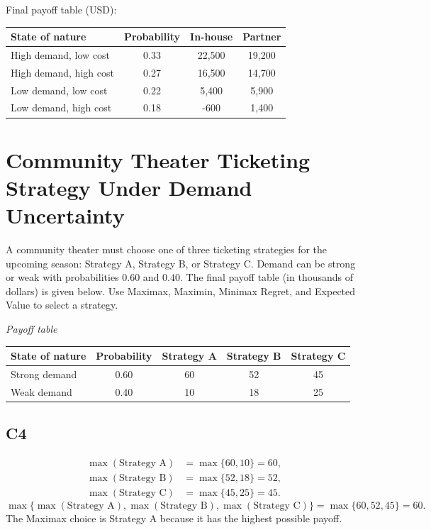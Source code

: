\begin{ExamProblems}
		Final payoff table (USD):
		\begin{center}
			\begin{tabular}{l c c c}
				\toprule
				State of nature & Probability & In-house & Partner \\
				\midrule
				High demand, low cost & 0.33 & 22{,}500 & 19{,}200 \\
				High demand, high cost & 0.27 & 16{,}500 & 14{,}700 \\
				Low demand, low cost & 0.22 & 5{,}400 & 5{,}900 \\
				Low demand, high cost & 0.18 & -600 & 1{,}400 \\
				\bottomrule
			\end{tabular}
		\end{center}
		
		\item
		\section{Community Theater Ticketing Strategy Under Demand Uncertainty}
		A community theater must choose one of three ticketing strategies for the upcoming season: Strategy A, Strategy B,
		or Strategy C. Demand can be strong or weak with probabilities $0.60$ and $0.40$. The final payoff table (in thousands of dollars)
		is given below. Use Maximax, Maximin, Minimax Regret, and Expected Value to select a strategy.
		
		\begin{center}
			\textit{Payoff table} \\
			\begin{tabular}{l c c c c}
				\toprule
				State of nature & Probability & Strategy A & Strategy B & Strategy C \\
				\midrule
				Strong demand & 0.60 & 60 & 52 & 45 \\
				Weak demand & 0.40 & 10 & 18 & 25 \\
				\bottomrule
			\end{tabular}
		\end{center}
		
		\subsection*{C4}
		\[
		\begin{aligned}
		\max(\text{Strategy A}) &= \max\{60,10\} = 60,\\
		\max(\text{Strategy B}) &= \max\{52,18\} = 52,\\
		\max(\text{Strategy C}) &= \max\{45,25\} = 45.
		\end{aligned}
		\]
		\[
		\max\{\max(\text{Strategy A}), \max(\text{Strategy B}), \max(\text{Strategy C})\}
		= \max\{60, 52, 45\}
		= 60.
		\]
		The Maximax choice is Strategy A because it has the highest possible payoff.
		

\end{ExamProblems}
